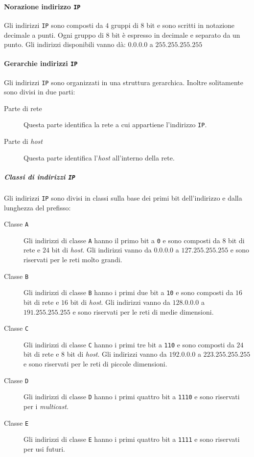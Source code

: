             \paragraph{Norazione indirizzo \texttt{IP}} Gli indirizzi \texttt{IP} sono composti da $4$ gruppi di $8$ bit e sono scritti in notazione decimale a punti. Ogni gruppo di $8$ bit è espresso in decimale e separato da un punto. Gli indirizzi disponibili vanno dà: $0.0.0.0$ a $255.255.255.255$ 
            \paragraph{Gerarchie indirizzi \texttt{IP}} Gli indirizzi \texttt{IP} sono organizzati in una struttura gerarchica. Inoltre solitamente sono divisi in due parti: \begin{description}
                \item[Parte di rete] Questa parte identifica la rete a cui appartiene l'indirizzo \texttt{IP}.
                \item[Parte di \textit{host}] Questa parte identifica l'\textit{host} all'interno della rete.
            \end{description}
            \subparagraph{Classi di indirizzi \texttt{IP}} Gli indirizzi \texttt{IP} sono divisi in classi sulla base dei primi bit dell'indirizzo e dalla lunghezza del prefisso: \begin{description}
                \item[Classe \texttt{A}] Gli indirizzi di classe \texttt{A} hanno il primo bit a \texttt{0} e sono composti da $8$ bit di rete e $24$ bit di \textit{host}. Gli indirizzi vanno da $0.0.0.0$ a $ 127.255.255.255$ e sono riservati per le reti molto grandi.
                \item[Classe \texttt{B}] Gli indirizzi di classe \texttt{B} hanno i primi due bit a \texttt{10} e sono composti da $16$ bit di rete e $16$ bit di \textit{host}. Gli indirizzi vanno da $128.0.0.0$ a $191.255.255.255$ e sono riservati per le reti di medie dimensioni.
                \item[Classe \texttt{C}] Gli indirizzi di classe \texttt{C} hanno i primi tre bit a \texttt{110} e sono composti da $24$ bit di rete e $8$ bit di \textit{host}. Gli indirizzi vanno da $192.0.0.0$ a $223.255.255.255$ e sono riservati per le reti di piccole dimensioni.
                \item[Classe \texttt{D}] Gli indirizzi di classe \texttt{D} hanno i primi quattro bit a \texttt{1110} e sono riservati per i \textit{multicast}.
                \item[Classe \texttt{E}] Gli indirizzi di classe \texttt{E} hanno i primi quattro bit a \texttt{1111} e sono riservati per usi futuri.
            \end{description}
